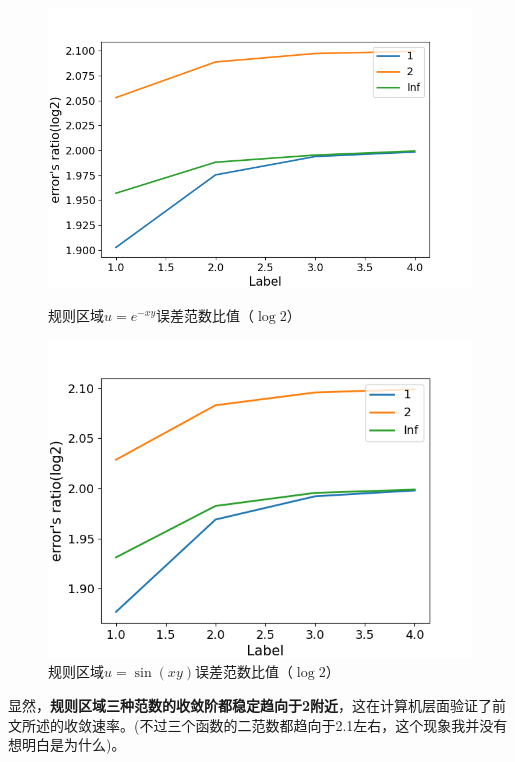 \documentclass{ctexart}
\begin{document}
\begin{sloppypar}
\begin{figure}[H]
  \begin{minipage}[t]{0.5\linewidth}
    \centering
    \includegraphics[scale = 0.5]{f2_NE.png}
    \caption{规则区域$u=e^{-xy}$误差范数比值（$\log 2$）}
  \end{minipage}
  \begin{minipage}[t]{0.5\linewidth}
    \centering
    \includegraphics[scale = 0.5]{f3_NE.png}
    \caption{规则区域$u=\sin(xy)$误差范数比值（$\log 2$）}
  \end{minipage}
  \label{fig2}
\end{figure}
显然，\textbf{规则区域三种范数的收敛阶都稳定趋向于2附近}，这在计算机层面验证了前文所述的收敛速率。(不过三个函数的二范数都趋向于2.1左右，这个现象我并没有想明白是为什么)。


\end{sloppypar}
\end{document}

